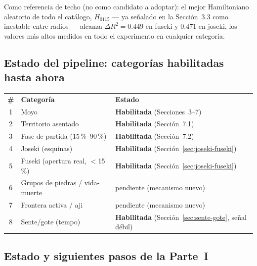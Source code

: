 \documentclass[11pt, a4paper]{article}
\newcommand{\TH}[1]{\cellcolor{cTHbg}\color{white}\textbf{#1}}
\newcommand{\good}[1]{\color{cGood}\textbf{#1}}
\begin{document}
Como referencia de techo (no como candidato a adoptar): el mejor
Hamiltoniano aleatorio de todo el cat\'alogo, $H_{0115}$ --- ya
se\~nalado en la Secci\'on~3.3 como inestable entre radios --- alcanza
$\Delta R^2=0.449$ en fuseki y $0.471$ en joseki, los valores m\'as
altos medidos en todo el experimento en cualquier categor\'ia.

\subsection{Estado del pipeline: categor\'ias habilitadas hasta ahora}

\medskip
\begin{center}
\begin{tabular}{cll}
  \TH{\#} & \TH{Categor\'ia} & \TH{Estado} \\[1pt]
  1 & Moyo & \good{Habilitada} (Secciones~3--7) \\
  2 & Territorio asentado & \good{Habilitada} (Secci\'on~7.1) \\
  3 & Fase de partida (15\,\%--90\,\%) & \good{Habilitada} (Secci\'on~7.2) \\
  4 & Joseki (esquinas) & \good{Habilitada} (Secci\'on~\ref{sec:joseki-fuseki}) \\
  5 & Fuseki (apertura real, $<$15\,\%) & \good{Habilitada} (Secci\'on~\ref{sec:joseki-fuseki}) \\
  6 & Grupos de piedras / vida-muerte & pendiente (mecanismo nuevo) \\
  7 & Frontera activa / aji & pendiente (mecanismo nuevo) \\
  8 & Sente/gote (tempo) & \good{Habilitada} (Secci\'on~\ref{sec:sente-gote}, se\~nal d\'ebil) \\
\end{tabular}
\end{center}
\medskip

\subsection{Estado y siguientes pasos de la Parte~I}
\end{document}
